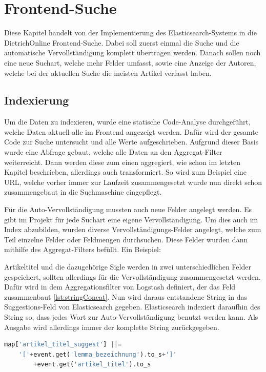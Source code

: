 \chapter{Frontend-Suche}

Diese Kapitel handelt von der Implementierung des Elasticsearch-Systems in die DietrichOnline Frontend-Suche. Dabei soll zuerst einmal die Suche und die automatische Vervollständigung komplett übertragen werden. Danach sollen noch eine neue Suchart, welche mehr Felder umfasst, sowie eine Anzeige der Autoren, welche bei der aktuellen Suche die meisten Artikel verfasst haben.

\section{Indexierung}

Um die Daten zu indexieren, wurde eine statische Code-Analyse durchgeführt, welche Daten aktuell alle im Frontend angezeigt werden. Dafür wird der gesamte Code zur Suche untersucht und alle Werte aufgeschrieben. Aufgrund dieser Basis wurde eine Abfrage gebaut, welche alle Daten an den Aggregat-Filter weiterreicht. Dann werden diese zum einen aggregiert, wie schon im letzten Kapitel beschrieben, allerdings auch transformiert. So wird zum Beispiel eine URL, welche vorher immer zur Laufzeit zusammengesetzt wurde nun direkt schon zusammengebaut in die Suchmaschine eingepflegt. 

Für die Auto-Vervollständigung mussten auch neue Felder angelegt werden. Es gibt im Projekt für jede Suchart eine eigene Vervollständigung. Um dies auch im Index abzubilden, wurden diverse Vervollständigungs-Felder angelegt, welche zum Teil einzelne Felder oder Feldmengen durchsuchen. Diese Felder wurden dann mithilfe des Aggregat-Filters befüllt. Ein Beispiel:

Artikeltitel und die dazugehörige Sigle werden in zwei unterschiedlichen Felder gespeichert, sollten allerdings für die Vervollständigung zusammengesetzt werden.
Dafür wird in dem Aggregationsfilter von Logstash definiert, der das Feld zusammenbaut \ref{lst:stringConcat}. Nun wird daraus entstandene String in das Suggestions-Feld von Elasticsearch gegeben. Elasticsearch indexiert daraufhin des String so, dass jedes Wort zur Auto-Vervollständigung benutzt werden kann. Als Ausgabe wird allerdings immer der komplette String zurückgegeben.

\begin{lstlisting}[language=PHP, frame=single, label={lst:stringConcat}] 
map['artikel_titel_suggest'] ||= 
    '['+event.get('lemma_bezeichnung').to_s+']'
        +event.get('artikel_titel').to_s
\end{lstlisting}

